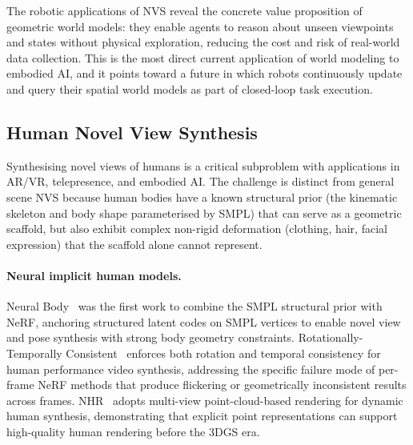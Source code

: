 The robotic applications of NVS reveal the concrete value proposition of
geometric world models: they enable agents to reason about unseen viewpoints
and states without physical exploration, reducing the cost and risk of
real-world data collection.
This is the most direct current application of world modeling to embodied AI,
and it points toward a future in which robots continuously update and query
their spatial world models as part of closed-loop task execution.

\subsection{Human Novel View Synthesis}

Synthesising novel views of humans is a critical subproblem with applications
in AR/VR, telepresence, and embodied AI.
The challenge is distinct from general scene NVS because human bodies have
a known structural prior (the kinematic skeleton and body shape parameterised
by SMPL) that can serve as a geometric scaffold, but also exhibit complex
non-rigid deformation (clothing, hair, facial expression) that the scaffold
alone cannot represent.

\paragraph{Neural implicit human models.}
Neural Body~\citep{peng2021neuralbody} was the first work to combine the
SMPL structural prior with NeRF, anchoring structured latent codes on
SMPL vertices to enable novel view and pose synthesis with strong
body geometry constraints.
Rotationally-Temporally Consistent~\citep{liu2021rtcnvs} enforces both
rotation and temporal consistency for human performance video synthesis,
addressing the specific failure mode of per-frame NeRF methods that produce
flickering or geometrically inconsistent results across frames.
NHR~\citep{wu2020nhr} adopts multi-view point-cloud-based rendering for
dynamic human synthesis, demonstrating that explicit point representations
can support high-quality human rendering before the 3DGS era.

